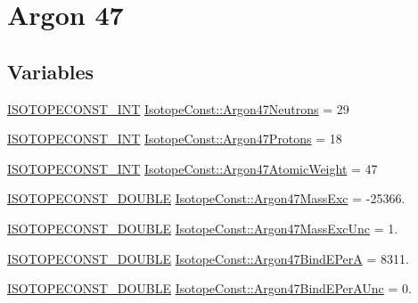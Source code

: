 \hypertarget{group___isotope_const-_argon-_ar47}{}\section{Argon 47}
\label{group___isotope_const-_argon-_ar47}
\subsection*{Variables}
\begin{DoxyCompactItemize}
\item 
\mbox{\hyperlink{group___isotope_const-_macros_ga5f18360b3e99483a35c32d789e62621c}{I\+S\+O\+T\+O\+P\+E\+C\+O\+N\+S\+T\+\_\+\+I\+NT}} \mbox{\hyperlink{group___isotope_const-_argon-_ar47_ga4c97ebd3ae0d46f7599da4e14c854230}{Isotope\+Const\+::\+Argon47\+Neutrons}} = 29
\item 
\mbox{\hyperlink{group___isotope_const-_macros_ga5f18360b3e99483a35c32d789e62621c}{I\+S\+O\+T\+O\+P\+E\+C\+O\+N\+S\+T\+\_\+\+I\+NT}} \mbox{\hyperlink{group___isotope_const-_argon-_ar47_ga4ee1d37e19c9b02303c98bcdec2d145d}{Isotope\+Const\+::\+Argon47\+Protons}} = 18
\item 
\mbox{\hyperlink{group___isotope_const-_macros_ga5f18360b3e99483a35c32d789e62621c}{I\+S\+O\+T\+O\+P\+E\+C\+O\+N\+S\+T\+\_\+\+I\+NT}} \mbox{\hyperlink{group___isotope_const-_argon-_ar47_gaf250f9f0edb0824b68380015930a864f}{Isotope\+Const\+::\+Argon47\+Atomic\+Weight}} = 47
\item 
\mbox{\hyperlink{group___isotope_const-_macros_ga8f45a7272ce02c0b4c65c44636ed719a}{I\+S\+O\+T\+O\+P\+E\+C\+O\+N\+S\+T\+\_\+\+D\+O\+U\+B\+LE}} \mbox{\hyperlink{group___isotope_const-_argon-_ar47_gab8879c2709823cd127a3f5c9bc143e8e}{Isotope\+Const\+::\+Argon47\+Mass\+Exc}} = -\/25366.
\item 
\mbox{\hyperlink{group___isotope_const-_macros_ga8f45a7272ce02c0b4c65c44636ed719a}{I\+S\+O\+T\+O\+P\+E\+C\+O\+N\+S\+T\+\_\+\+D\+O\+U\+B\+LE}} \mbox{\hyperlink{group___isotope_const-_argon-_ar47_gad8a577a9f0e9bb728ac2f1394bff77df}{Isotope\+Const\+::\+Argon47\+Mass\+Exc\+Unc}} = 1.
\item 
\mbox{\hyperlink{group___isotope_const-_macros_ga8f45a7272ce02c0b4c65c44636ed719a}{I\+S\+O\+T\+O\+P\+E\+C\+O\+N\+S\+T\+\_\+\+D\+O\+U\+B\+LE}} \mbox{\hyperlink{group___isotope_const-_argon-_ar47_ga7f216305cb0f8d1986eadc4143f3f036}{Isotope\+Const\+::\+Argon47\+Bind\+E\+PerA}} = 8311.
\item 
\mbox{\hyperlink{group___isotope_const-_macros_ga8f45a7272ce02c0b4c65c44636ed719a}{I\+S\+O\+T\+O\+P\+E\+C\+O\+N\+S\+T\+\_\+\+D\+O\+U\+B\+LE}} \mbox{\hyperlink{group___isotope_const-_argon-_ar47_ga5cc2e87d90164e49eb4f0fe17259dc29}{Isotope\+Const\+::\+Argon47\+Bind\+E\+Per\+A\+Unc}} = 0.

\end{DoxyCompactItemize}

